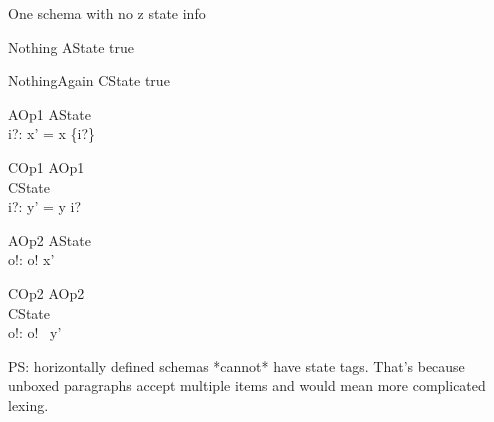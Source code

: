 One schema with no z state info
\begin{schema}{Nothing}
   \Delta AState
\where
   true
\end{schema}

\begin{schema}{NothingAgain}
   \Delta CState
\where
   true
\end{schema}

\begin{schema}{AOp1}
   \Delta AState \\
   i?: \nat
\where
   x' = x \cup \{i?\}
\end{schema}

\begin{schema}{COp1}
  \zfsrefines AOp1 \\
   \Delta CState \\
   i?: \nat
\where
   y' = y \cat \langle i? \rangle
\end{schema}

\begin{schema}{AOp2}
   \Xi AState \\
   o!: \nat
\where
    o! \in  x'
\end{schema}

\begin{schema}{COp2}
  \zbsrefines AOp2 \\
   \Xi CState \\
   o!: \nat
\where
   o! \in \ran~y'
\end{schema}

PS: horizontally defined schemas *cannot* have state tags. That's because
unboxed paragraphs accept multiple items and would mean more complicated lexing.